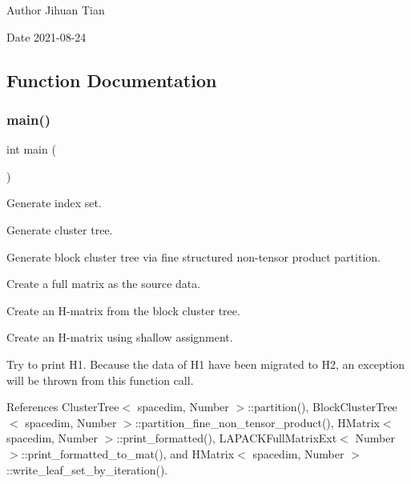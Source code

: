 \begin{DoxyAuthor}{Author}
Jihuan Tian 
\end{DoxyAuthor}
\begin{DoxyDate}{Date}
2021-\/08-\/24 
\end{DoxyDate}


\subsection{Function Documentation}
\mbox{\label{hmatrix-overloaded-shallow-assignment_8cc_ae66f6b31b5ad750f1fe042a706a4e3d4}} 
\subsubsection{\texorpdfstring{main()}{main()}}
{\footnotesize\ttfamily int main (\begin{DoxyParamCaption}{ }\end{DoxyParamCaption})}

Generate index set.

Generate cluster tree.

Generate block cluster tree via fine structured non-\/tensor product partition.

Create a full matrix as the source data.

Create an H-\/matrix from the block cluster tree.

Create an H-\/matrix using shallow assignment.

Try to print H1. Because the data of H1 have been migrated to H2, an exception will be thrown from this function call.

References Cluster\+Tree$<$ spacedim, Number $>$\+::partition(), Block\+Cluster\+Tree$<$ spacedim, Number $>$\+::partition\+\_\+fine\+\_\+non\+\_\+tensor\+\_\+product(), H\+Matrix$<$ spacedim, Number $>$\+::print\+\_\+formatted(), L\+A\+P\+A\+C\+K\+Full\+Matrix\+Ext$<$ Number $>$\+::print\+\_\+formatted\+\_\+to\+\_\+mat(), and H\+Matrix$<$ spacedim, Number $>$\+::write\+\_\+leaf\+\_\+set\+\_\+by\+\_\+iteration().

